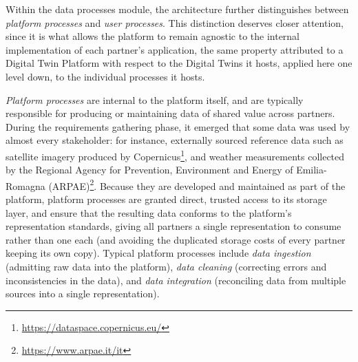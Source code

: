 Within the data processes module, the architecture further distinguishes between \emph{platform processes} and \emph{user processes}. This distinction deserves closer attention, since it is what allows the platform to remain agnostic to the internal implementation of each partner's application, the same property  attributed to a Digital Twin Platform with respect to the Digital Twins it hosts, applied here one level down, to the individual processes it hosts.

\emph{Platform processes} are internal to the platform itself, and are typically responsible for producing or maintaining data of shared value across partners. During the requirements gathering phase, it emerged that some data was used by almost every stakeholder: for instance, externally sourced reference data such as satellite imagery produced by Copernicus\footnote{\url{https://dataspace.copernicus.eu/}}, and weather measurements collected by the Regional Agency for Prevention, Environment and Energy of Emilia-Romagna (ARPAE)\footnote{\url{https://www.arpae.it/it}}. Because they are developed and maintained as part of the platform, platform processes are granted direct, trusted access to its storage layer, and ensure that the resulting data conforms to the platform's representation standards, giving all partners a single representation to consume rather than one each (and avoiding the duplicated storage costs of every partner keeping its own copy). Typical platform processes include \emph{data ingestion} (admitting raw data into the platform), \emph{data cleaning} (correcting errors and inconsistencies in the data), and \emph{data integration} (reconciling data from multiple sources into a single representation).

